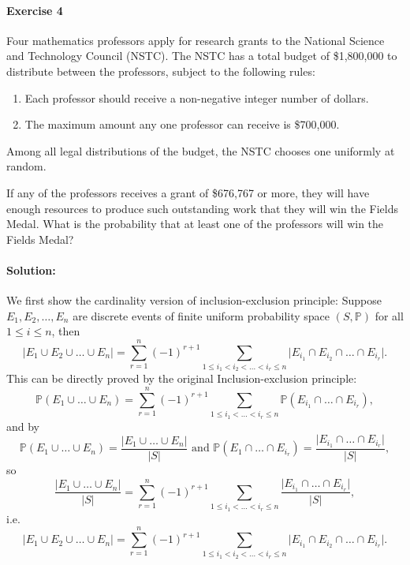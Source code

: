 \documentclass[a4paper,12pt]{article}
\begin{document}
\newpage

\paragraph{Exercise 4}  Four mathematics professors apply for research grants to the National Science and Technology Council (NSTC). The NSTC has a total budget of \$1,800,000 to distribute between the professors, subject to the following rules:
\begin{enumerate}
	\item Each professor should receive a non-negative integer number of dollars.
	\item The maximum amount any one professor can receive is \$700,000.
\end{enumerate}
Among all legal distributions of the budget, the NSTC chooses one uniformly at random.

If any of the professors receives a grant of \$676,767 or more, they will have enough resources to produce such outstanding work that they will win the Fields Medal. What is the probability that at least one of the professors will win the Fields Medal?

\paragraph{Solution:} We first show the cardinality version of inclusion-exclusion principle: Suppose \(E_1, E_2, \dots , E_n\) are discrete events of finite uniform probability space \((S, \mathbb{P})\) for all \(1 \le i \le n\), then 
\[
	\vert E_1 \cup E_2 \cup \dots \cup E_n \vert = \sum_{r=1}^n (-1)^{r+1} \sum_{1 \le i_1 < i_2 < \dots < i_r \le n} \vert E_{i_1} \cap E_{i_2} \cap \dots \cap E_{i_r} \vert.   
\]
This can be directly proved by the original Inclusion-exclusion principle:
\[
	\mathbb{P} (E_1 \cup \dots \cup E_n) = \sum_{r=1}^n (-1)^{r+1} \sum_{1 \le i_1 < \dots < i_r \le n} \mathbb{P} (E_{i_1} \cap \dots \cap E_{i_r}),  
\]    
and by 
\[
	\mathbb{P} (E_1 \cup \dots \cup E_n) = \frac{\vert E_1 \cup \dots \cup E_n \vert }{\vert S \vert } \text{ and } \mathbb{P} (E_1 \cap \dots \cap E_{i_r}) = \frac{\vert E_{i_1} \cap \dots \cap E_{i_r} \vert }{\vert S \vert }, 
\] 
so 
\[
	\frac{\vert E_1 \cup \dots \cup E_n \vert }{\vert S \vert } = \sum_{r=1}^n (-1)^{r+1} \sum_{1 \le i_1 < \dots < i_r \le n} \frac{\vert E_{i_1} \cap \dots \cap E_{i_r} \vert }{\vert S \vert },
\] i.e. 
\[
	\vert E_1 \cup E_2 \cup \dots \cup E_n \vert = \sum_{r=1}^n (-1)^{r+1} \sum_{1 \le i_1 < i_2 < \dots < i_r \le n} \vert E_{i_1} \cap E_{i_2} \cap \dots \cap E_{i_r} \vert.
\]
\end{document}

